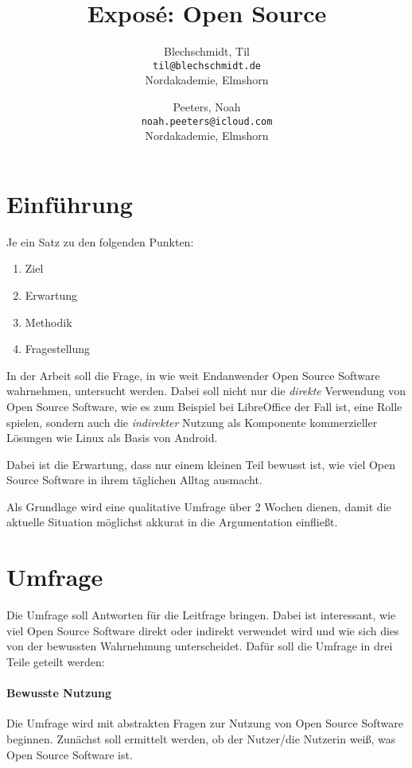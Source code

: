 \documentclass[a4paper]{article}
\title{Exposé: Open Source}
\author{
  Blechschmidt, Til\\
  \texttt{til@blechschmidt.de}\\
  Nordakademie, Elmshorn
  \and
  Peeters, Noah\\
  \texttt{noah.peeters@icloud.com}\\
  Nordakademie, Elmshorn
}
\begin{document}
	\maketitle
	
	\section{Einführung}
	   Je ein Satz zu den folgenden Punkten:
	   \begin{enumerate}
	       \item Ziel
	       \item Erwartung
	       \item Methodik
	       \item Fragestellung
	   \end{enumerate}
	
	   In der Arbeit soll die Frage, in wie weit Endanwender Open Source Software wahrnehmen, untersucht werden. Dabei soll nicht nur die \emph{direkte} Verwendung von Open Source Software, wie es zum Beispiel bei LibreOffice der Fall ist, eine Rolle spielen, sondern auch die \emph{indirekter} Nutzung als Komponente kommerzieller Lösungen wie Linux als Basis von Android.
	   
	   Dabei ist die Erwartung, dass nur einem kleinen Teil bewusst ist, wie viel Open Source Software in ihrem täglichen Alltag ausmacht.
	   
	   Als Grundlage wird eine qualitative Umfrage über 2 Wochen dienen, damit die aktuelle Situation möglichst akkurat in die Argumentation einfließt.
	
	\section{Umfrage}
	   Die Umfrage soll Antworten für die Leitfrage bringen. Dabei ist interessant, wie viel Open Source Software direkt oder indirekt verwendet wird und wie sich dies von der bewussten Wahrnehmung unterscheidet. Dafür soll die Umfrage in drei Teile geteilt werden:
	   
	   \paragraph{Bewusste Nutzung}
	       Die Umfrage wird mit abstrakten Fragen zur Nutzung von Open Source Software beginnen. Zunächst soll ermittelt werden, ob der Nutzer/die Nutzerin weiß, was Open Source Software ist.
	       
\end{document}
